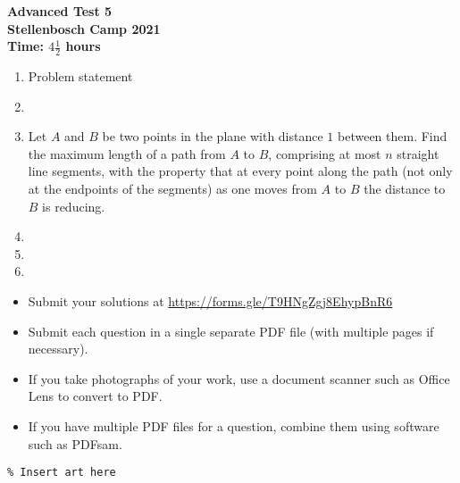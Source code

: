 \documentclass{article}
\begin{document}
\thispagestyle{empty}

\begin{center}
  \textbf{\Large Advanced Test 5}
  \\ \vspace{1em}
  \textbf{\large Stellenbosch Camp 2021}
  \\ \vspace{1em}
  \textbf{\large Time: $4\frac{1}{2}$ hours}
\end{center}

\bigskip

\begin{enumerate}[itemsep=\fill]

\item %
Problem statement


\item %


\item %
Let $A$ and $B$ be two points in the plane with distance $1$ between them.
Find the maximum length of a path from $A$ to $B$, comprising at most $n$ straight line segments, with the property that at every point along the path (not only at the endpoints of the segments) as one moves from $A$ to $B$ the distance to $B$ is reducing.


\item %


\item %


\item %

\end{enumerate}


\vfill
\small
\begin{itemize}
	\item Submit your solutions at \href{https://forms.gle/T9HNgZgj8EhypBnR6}{https://forms.gle/T9HNgZgj8EhypBnR6}
	\item Submit each question in a single separate PDF file (with multiple pages if necessary).
	\item If you take photographs of your work, use a document scanner such as Office Lens to convert to PDF.
	\item If you have multiple PDF files for a question, combine them using software such as PDFsam.
\end{itemize}

\vfill
\centering
\small
\begin{BVerbatim}
\end{BVerbatim}
\end{document}
